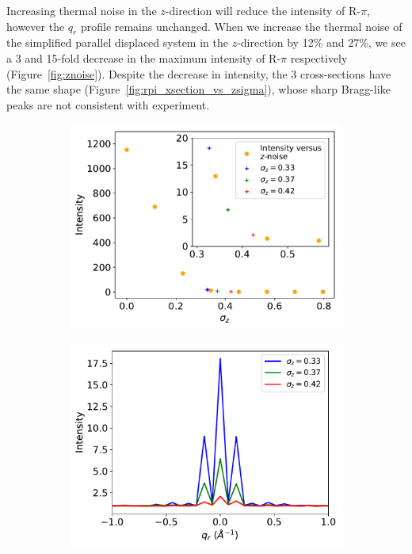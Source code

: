 \documentclass[journal=jpcbfk,manuscript=article]{achemso}
\begin{document}
  Increasing thermal noise in the $z$-direction will reduce the intensity
  of R-$\pi$, however the $q_r$ profile remains unchanged. When we increase the
  thermal noise of the simplified parallel displaced system in the $z$-direction by
  12\% and 27\%, we see a 3 and 15-fold decrease in the maximum intensity of 
  R-$\pi$ respectively (Figure~\ref{fig:znoise}). Despite the decrease in 
  intensity, the 3 cross-sections have the same shape 
  (Figure~\ref{fig:rpi_xsection_vs_zsigma}), whose sharp Bragg-like peaks are
  not consistent with experiment. 
  
  \begin{figure}[!htb]
  \centering
  \begin{subfigure}{0.49\textwidth}
  \includegraphics[width=\textwidth]{intensity_vs_zsigma.pdf}
  \caption{}\label{fig:intensity_vs_zsigma}
  \end{subfigure}
  \begin{subfigure}{0.49\textwidth}
  \includegraphics[width=\textwidth]{rpi_xsection_vs_zsigma.pdf}

\end{subfigure}
\end{figure}
\end{document}
